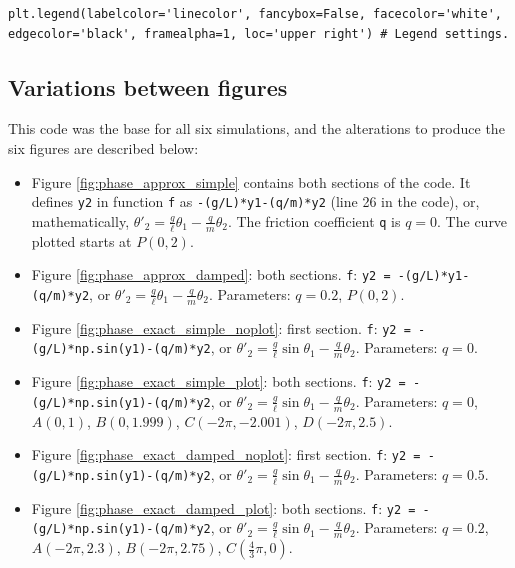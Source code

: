 \documentclass[12pt, a4paper, titlepage]{article}
\theoremstyle{definition}
\numberwithin{equation}{section}
\theoremstyle{definition}
\theoremstyle{definition}
\begin{document}
\begin{appendices}
\begin{lstlisting}[firstnumber=51]
plt.legend(labelcolor='linecolor', fancybox=False, facecolor='white', edgecolor='black', framealpha=1, loc='upper right') # Legend settings.
\end{lstlisting}
\subsection{Variations between figures}
This code was the base for all six simulations, and the alterations to produce the six figures are described below:
\begin{itemize}
\item Figure \ref{fig:phase_approx_simple} contains both sections of the code. It defines \verb+y2+ in function \verb+f+ as \verb+-(g/L)*y1-(q/m)*y2+ (line 26 in the code), or, mathematically, $\theta'_2=\frac{g}{\ell}\theta_1-\frac{q}{m}\theta_2$. The friction coefficient \verb+q+ is $q=0$. The curve plotted starts at $P(0, 2)$.
\item Figure \ref{fig:phase_approx_damped}: both sections. \verb+f+: \verb+y2 = -(g/L)*y1-(q/m)*y2+, or $\theta'_2=\frac{g}{\ell}\theta_1-\frac{q}{m}\theta_2$. Parameters: $q=0.2$, $P(0, 2)$.
\item Figure \ref{fig:phase_exact_simple_noplot}: first section. \verb+f+: \verb+y2 = -(g/L)*np.sin(y1)-(q/m)*y2+, or $\theta'_2=\frac{g}{\ell}\sin \theta_1-\frac{q}{m}\theta_2$. Parameters: $q=0$.
\item Figure \ref{fig:phase_exact_simple_plot}: both sections. \verb+f+: \verb+y2 = -(g/L)*np.sin(y1)-(q/m)*y2+, or $\theta'_2=\frac{g}{\ell}\sin \theta_1-\frac{q}{m}\theta_2$. Parameters: $q=0$, $A(0, 1)$, $B(0, 1.999)$, $C(-2\pi, -2.001)$, $D(-2\pi, 2.5)$.
\item Figure \ref{fig:phase_exact_damped_noplot}: first section. \verb+f+: \verb+y2 = -(g/L)*np.sin(y1)-(q/m)*y2+, or $\theta'_2=\frac{g}{\ell}\sin \theta_1-\frac{q}{m}\theta_2$. Parameters: $q=0.5$.
\item Figure \ref{fig:phase_exact_damped_plot}: both sections. \verb+f+: \verb+y2 = -(g/L)*np.sin(y1)-(q/m)*y2+, or $\theta'_2=\frac{g}{\ell}\sin \theta_1-\frac{q}{m}\theta_2$. Parameters: $q=0.2$, $A(-2\pi, 2.3)$, $B(-2\pi, 2.75)$, $C(\frac{4}{3}\pi, 0)$.
\end{itemize}
\end{appendices}
\end{document}
